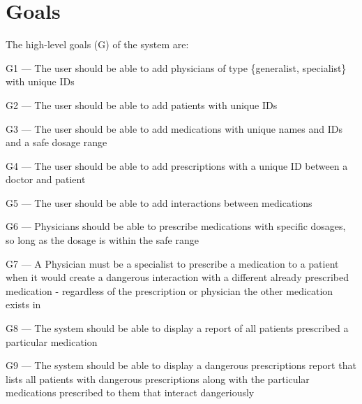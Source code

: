 \section{Goals}

The high-level goals (G) of the system are:

\begin{mylist}
\item G1 --- The user should be able to add physicians of type \{generalist, specialist\} with unique IDs
\item G2 --- The user should be able to add patients with unique IDs
\item G3 --- The user should be able to add medications with unique names and IDs and a safe dosage range
\item G4 --- The user should be able to add prescriptions with a unique ID between a doctor and patient
\item G5 --- The user should be able to add interactions between medications
\item G6 --- Physicians should be able to prescribe medications with specific dosages, so long as the dosage is within the safe range
\item G7 --- A Physician must be a specialist to prescribe a medication to a patient when it would create a dangerous interaction with a different already prescribed medication - regardless of the prescription or physician the other medication exists in
\item G8 --- The system should be able to display a report of all patients prescribed a particular medication
\item G9 --- The system should be able to display a dangerous prescriptions report that lists all patients with dangerous prescriptions along with the particular medications prescribed to them that interact dangeriously

\end{mylist}